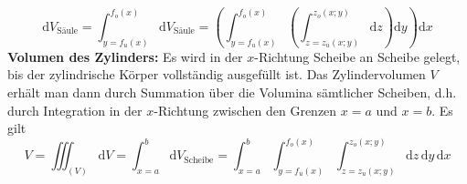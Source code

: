 \begin{equation}
\boxed{\text{d}V_{\text{Säule}}=\displaystyle \int_{y=f_u\left(x\right)}^{f_o\left(x\right)}\text{d}V_{\text{Säule}}=\left(\displaystyle \int_{y=f_u\left(x\right)}^{f_o\left(x\right)}\left(\displaystyle \int_{z=z_u\left(x; y\right)}^{z_o\left(x; y\right)}\text{d}z\right)\text{d}y\right)\text{d}x}
\end{equation}
\textbf{Volumen des Zylinders:} Es wird in der $x$-Richtung Scheibe an Scheibe gelegt, bis der zylindrische Körper vollständig ausgefüllt ist. Das Zylindervolumen $V$ erhält man dann durch Summation über die Volumina sämtlicher Scheiben, d.h. durch Integration in der $x$-Richtung zwischen den Grenzen $x=a$ und $x=b$. Es gilt
\begin{equation}
\boxed{V=\displaystyle \iiint_{\left(V\right)}\text{d}V=\displaystyle \int_{x=a}^{b}\text{d}V_{\text{Scheibe}}=\displaystyle \int_{x=a}^b\displaystyle \int_{y=f_u\left(x\right)}^{f_o\left(x\right)}\displaystyle \int_{z=z_u\left(x; y\right)}^{z_o\left(x; y\right)}\text{d}z\,\text{d}y\,\text{d}x}
\end{equation}
